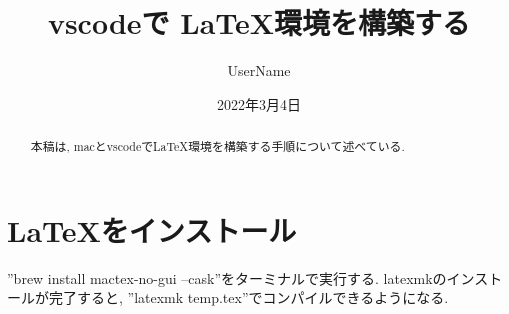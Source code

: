 \documentclass[a4paper,11pt]{jsarticle}
\title{vscodeで \LaTeX 環境を構築する}
\author{UserName}
\date{2022年3月4日}
\begin{document}
\maketitle

\begin{abstract}
本稿は, macとvscodeで\LaTeX 環境を構築する手順について述べている.
\end{abstract}

\section{\LaTeX をインストール}

''brew install mactex-no-gui --cask''をターミナルで実行する. latexmkのインストールが完了すると, ''latexmk temp.tex''でコンパイルできるようになる.
\end{document}
